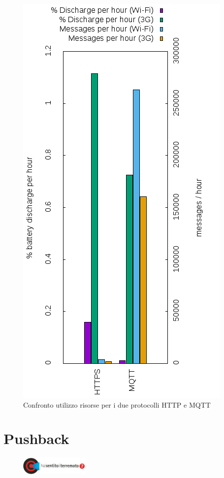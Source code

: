 \documentclass[a4paper,10pt]{memoir}
\begin{document}
\begin{figure}[ht]
\centering
\caption{Confronto utilizzo risorse per i due protocolli HTTP e MQTT}
\label{fig:networkperformance}
\includegraphics[scale=0.8]{database/networkperformance}
\end{figure}

\pagebreak

\section{Pushback}
\label{section:pushback}

\begin{figure}
\includegraphics[width=0.30\textwidth]{app/hsit}
\end{figure}
\end{document}
